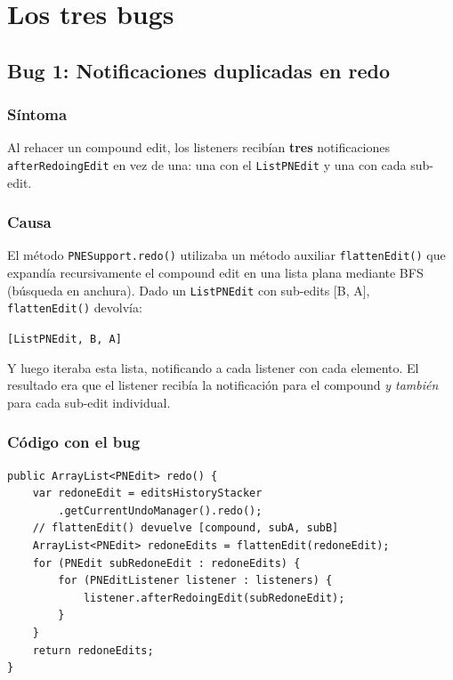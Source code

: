 \documentclass[12pt,a4paper]{article}
\newcommand{\code}[1]{\texttt{#1}}
\newcommand{\clase}[1]{\texttt{#1}}
\newcommand{\metodo}[1]{\texttt{#1}}
\begin{document}
\section{Los tres bugs}
\label{sec:bugs}


\subsection{Bug 1: Notificaciones duplicadas en redo}
\label{sec:bug1}

\subsubsection{Síntoma}

Al rehacer un compound edit, los listeners recibían \textbf{tres}
notificaciones \metodo{afterRedoingEdit} en vez de una: una con el
\clase{ListPNEdit} y una con cada sub-edit.

\subsubsection{Causa}

El método \metodo{PNESupport.redo()} utilizaba un método auxiliar
\metodo{flattenEdit()} que expandía recursivamente el compound edit en una
lista plana mediante BFS (búsqueda en anchura). Dado un \clase{ListPNEdit}
con sub-edits [B, A], \metodo{flattenEdit()} devolvía:

\begin{center}
\code{[ListPNEdit, B, A]}
\end{center}

Y luego iteraba esta lista, notificando a cada listener con cada elemento.
El resultado era que el listener recibía la notificación para el compound
\emph{y también} para cada sub-edit individual.

\subsubsection{Código con el bug}

\begin{lstlisting}[caption={Método \metodo{redo()} con el bug (simplificado).},
  label=lst:redo-antes]
public ArrayList<PNEdit> redo() {
    var redoneEdit = editsHistoryStacker
        .getCurrentUndoManager().redo();
    // flattenEdit() devuelve [compound, subA, subB]
    ArrayList<PNEdit> redoneEdits = flattenEdit(redoneEdit);
    for (PNEdit subRedoneEdit : redoneEdits) {
        for (PNEditListener listener : listeners) {
            listener.afterRedoingEdit(subRedoneEdit);
        }
    }
    return redoneEdits;
}
\end{lstlisting}
\end{document}
